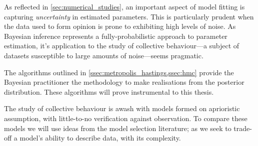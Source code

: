 As reflected in \cref{sec:numerical_studies}, an important aspect of model
fitting is capturing \emph{uncertainty} in estimated parameters. This is
particularly prudent when the data used to form opinion is prone to exhibiting
high levels of noise. As Bayesian inference represents a fully-probabilistic
approach to parameter estimation, it's application to the study of collective
behaviour---a subject of datasets susceptible to large amounts of noise---seems
pragmatic.

The algorithms outlined in \cref{ssec:metropolis_hastings,ssec:hmc} provide the
Bayesian practitioner the methodology to make realisations from the posterior
distribution. These algorithms will prove instrumental to this thesis.

The study of collective behaviour is awash with models formed on aprioristic
assumption, with little-to-no verification against observation. To compare
these models we will use ideas from the model selection literature; as we seek
to trade-off a model's ability to describe data, with its complexity.
